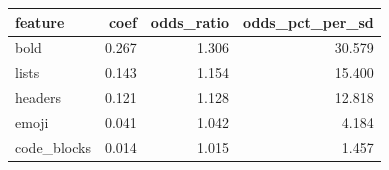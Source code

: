 \begin{tabular}{lrrr}
\toprule
feature & coef & odds_ratio & odds_pct_per_sd \\
\midrule
bold & 0.267 & 1.306 & 30.579 \\
lists & 0.143 & 1.154 & 15.400 \\
headers & 0.121 & 1.128 & 12.818 \\
emoji & 0.041 & 1.042 & 4.184 \\
code_blocks & 0.014 & 1.015 & 1.457 \\
\bottomrule
\end{tabular}
